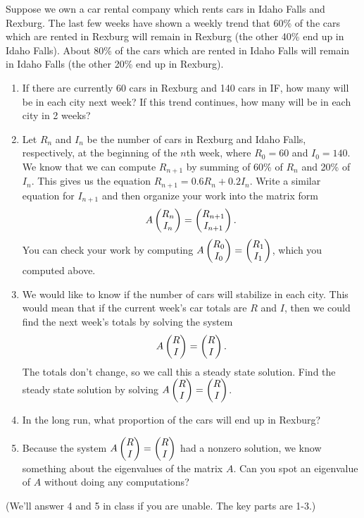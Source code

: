 \begin{problem}
Suppose we own a car rental company which rents cars in Idaho Falls and Rexburg. 
The last few weeks have shown a weekly trend that 60\% of the cars which are rented in Rexburg will remain in Rexburg (the other 40\% end up in Idaho Falls). 
About 80\% of the cars which are rented in Idaho Falls will remain in Idaho Falls (the other 20\% end up in Rexburg). 
\begin{enumerate}
 \item If there are currently 60 cars in Rexburg and 140 cars in IF, how many will be in each city next week? If this trend continues, how many will be in each city in 2 weeks?
 \item Let $R_n$ and $I_n$ be the number of cars in Rexburg and Idaho Falls, respectively, at the beginning of the $n$th week, where $R_0=60$ and $I_0=140$. We know that we can compute $R_{n+1}$ by summing of 60\% of $R_n$ and 20\% of $I_n$. This gives us the equation $R_{n+1}=0.6 R_n+0.2I_n$. Write a similar equation for $I_{n+1}$ and then organize your work into the matrix form $$A\begin{pmatrix} R_{n}\\I_{n} \end{pmatrix} = \begin{pmatrix} R_{n+1}\\I_{n+1} \end{pmatrix}.$$  You can check your work by computing $A\begin{pmatrix} R_0\\I_0 \end{pmatrix} = \begin{pmatrix} R_1\\I_1 \end{pmatrix}$, which you computed above.
 \item We would like to know if the number of cars will stabilize in each city. This would mean that if the current week's car totals are $R$ and $I$, then we could find the next week's totals by solving the system $$A\begin{pmatrix} R\\I \end{pmatrix} = \begin{pmatrix} R\\I \end{pmatrix}.$$  The totals don't change, so we call this a steady state solution. Find the steady state solution by solving $A\begin{pmatrix} R\\I \end{pmatrix} = \begin{pmatrix} R\\I \end{pmatrix}$. %
 \item In the long run, what proportion of the cars will end up in Rexburg?
 \item Because the system $A\begin{pmatrix} R\\I \end{pmatrix} = \begin{pmatrix} R\\I \end{pmatrix}$ had a nonzero solution, we know something about the eigenvalues of the matrix $A$.  Can you spot an eigenvalue of $A$ without doing any computations?
\end{enumerate}
(We'll answer 4 and 5 in class if you are unable.  The key parts are 1-3.) 
\end{problem}



